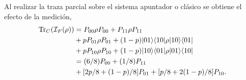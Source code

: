 {Al realizar la traza parcial sobre el sistema apuntador o clásico se obtiene el efecto de la medición, \begin{equation}\label{traza_A1_ejemplo1}
    \begin{split}
        {\rm Tr}_C(\mathcal{I}_F(\rho)) &= P_{00} \rho P_{00} + P_{11}\rho P_{11}\\
        &+p P_{01}\rho P_{01}+(1-p) |01\rangle \langle 10|\rho|10\rangle \langle01|\\
        &+p P_{10}\rho P_{10}+(1-p) |10\rangle \langle 01|\rho|01\rangle \langle10|\\
        &=(6/8)P_{00} + (1/8)P_{11}\\
        &+[2p/8 +(1-p)/8]P_{01}+ [p/8+2(1-p)/8]P_{10}.\\
    \end{split}
\end{equation}
\begin{comment} %
Para la segunda alternativa se procede de forma parecida sin embargo el efecto de la medición es diferente, \begin{equation}\label{segunda_alternativa_ejemplo1}
    \begin{split}
        \mathcal{I}_2(\rho)&=\sum_{j,k}\mathcal{F}(P_{a_j,b_k})\otimes P_{a_j,b_k} \rho P_{a_j,b_k}\\
        &=P_{00}\otimes P_{00} \la 00|\rho|00\ra + P_{11}\otimes P_{11} \la 11|\rho|11\ra\\
        &+P_{01} \otimes [pP_{01} \la 01|\rho|01\ra+(1-p)P_{10}\la 10|\rho|10\ra]\\
        &+P_{10} \otimes [p P_{10}\la 10|\rho|10\ra+(1-p)P_{01}\la 01|\rho|01\ra]\\
        &=P_{00}\otimes (6/8)P_{00} + P_{11}\otimes (1/8)P_{11}\\
        &+   P_{01} \otimes [2p/8P_{01} +(1-p)/8P_{10}]+P_{10} \otimes[p/8 P_{10}+2(1-p)/8 P_{01}].\\
    \end{split}
\end{equation}


De nuevo, al realizar la traza parcial sobre le sistema cuántico se obtendrá la probabilidad de cada una de las salidas posibles \begin{equation}\label{traza_S2_ejemplo1}
    \begin{split}
        \tr_Q(\mathcal{I}_2(\rho)) &= P_{00} \la 00|\rho|00\ra + P_{11} \la 11|\rho|11\ra\\
        &+P_{01}[p \la 01|\rho|01\ra+(1-p)\la 10|\rho|10\ra]\\
        &+P_{10}[p \la 10|\rho|10\ra+(1-p)\la 01|\rho|01\ra]\\
        &=(6/8)P_{00} + (1/8)P_{11}\\
        &+[2p/8 +(1-p)/8]P_{01}+ [p/8+2(1-p)/8]P_{10}.\\
    \end{split}
\end{equation}


\end{comment}}
